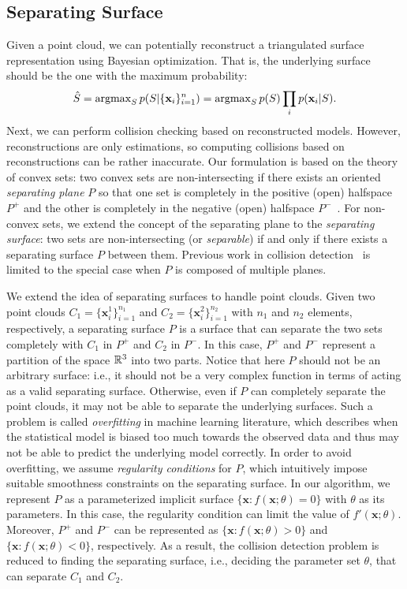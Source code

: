 \subsection{Separating Surface}
\label{sec:7:overview:2}
Given a point cloud, we can potentially reconstruct a triangulated surface representation using Bayesian optimization. That is, the underlying surface should be the one with the maximum probability:
\begin{equation}
\hat{S} = \operatorname{argmax}_S p(S|\{\mathbf x_i\}_{i=1}^n) = \operatorname{argmax}_S p(S) \prod_i p(\mathbf x_i | S).
\end{equation}
Next, we can perform collision checking based on reconstructed models. However, reconstructions are only estimations, so computing collisions based on reconstructions can be rather inaccurate.
Our formulation is based on the theory of convex sets: two convex sets are non-intersecting if there exists an oriented \emph{separating plane} $P$ so that one set is completely in the positive (open) halfspace $P^+$ and the other is completely in the negative (open) halfspace $P^-$~\cite{Mount:2004}. For non-convex sets, we extend the concept of the separating plane to the \emph{separating surface}: two sets are non-intersecting (or \emph{separable}) if and only if there exists a separating surface $P$ between them. Previous work in collision detection~\cite{Mount:2004, Ponamgi:1995} is limited to the special case when $P$ is composed of multiple planes.

We extend the idea of separating surfaces to handle point clouds. Given two point clouds $C_1 = \{\mathbf x_i^1\}_{i=1}^{n_1}$ and $C_2 = \{\mathbf x_i^2\}_{i=1}^{n_2}$
with $n_1$ and $n_2$ elements, respectively, a separating surface $P$ is a surface that can separate the two sets completely with $C_1$ in $P^+$ and $C_2$ in $P^-$.
In this case, $P^+$ and $P^-$ represent a partition of the space $\mathbb R^3$ into two parts. Notice that here $P$ should not be an
arbitrary surface: i.e., it should not be a very complex function in terms of acting as a valid separating surface. Otherwise, even if $P$ can completely separate the point clouds, it may not be able to separate the underlying surfaces. Such a problem is called \emph{overfitting} in machine learning literature, which describes when the statistical model is biased too much towards the observed data and thus may not be able to predict the underlying model correctly. In order to avoid overfitting, we assume \emph{regularity conditions} for $P$, which intuitively impose suitable smoothness constraints on the separating surface. In our algorithm, we represent $P$ as a parameterized implicit surface $\{\mathbf x: f(\mathbf x; \theta) = 0\}$ with $\theta$ as its parameters. In this case, the regularity condition can limit the value of $f'(\mathbf x; \theta)$. Moreover, $P^+$ and $P^-$ can be represented as $\{\mathbf x: f(\mathbf x; \theta) > 0\}$ and $\{\mathbf x: f(\mathbf x; \theta) < 0\}$, respectively. As a result, the collision detection problem is reduced to finding the separating surface, i.e., deciding the parameter set $\theta$, that can separate $C_1$ and $C_2$.


